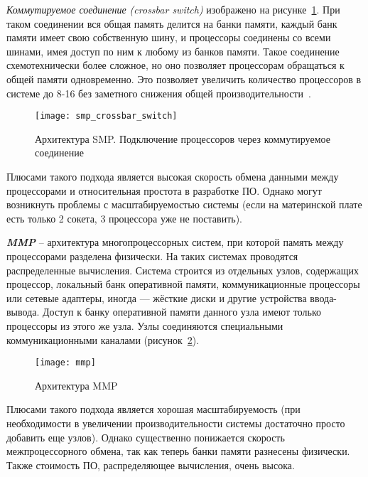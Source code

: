 \textit{Коммутируемое соединение (crossbar switch)} изображено на рисунке~\ref{SMPCrossbarSwitch:image}. При таком соединении вся общая память делится на банки памяти, каждый банк памяти имеет свою собственную шину, и процессоры соединены со всеми шинами, имея доступ по ним к любому из банков памяти. Такое соединение схемотехнически более сложное, но оно позволяет процессорам обращаться к общей памяти одновременно. Это позволяет увеличить количество процессоров в системе до 8-16 без заметного снижения общей производительности~\cite{Ryazanova2018}.

\begin{figure}[H]
    \texttt{[image: smp\_crossbar\_switch]}
    \caption{Архитектура SMP. Подключение процессоров через коммутируемое соединение}
    \label{SMPCrossbarSwitch:image}
\end{figure}

Плюсами такого подхода является высокая скорость обмена данными между процессорами и относительная простота в разработке ПО. Однако могут возникнуть проблемы с масштабируемостью системы (если на материнской плате есть только 2 сокета, 3 процессора уже не поставить).

\textbf{\textit{MMP}} -- архитектура многопроцессорных систем, при которой память между процессорами разделена физически. На таких системах проводятся распределенные вычисления. Система строится из отдельных узлов, содержащих процессор, локальный банк оперативной памяти, коммуникационные процессоры или сетевые адаптеры, иногда — жёсткие диски и другие устройства ввода-вывода. Доступ к банку оперативной памяти данного узла имеют только процессоры из этого же узла. Узлы соединяются специальными коммуникационными каналами (рисунок~\ref{MMP:image}).

\begin{figure}[H]
    \texttt{[image: mmp]}
    \caption{Архитектура MMP}
    \label{MMP:image}
\end{figure}

Плюсами такого подхода является хорошая масштабируемость (при необходимости в увеличении производительности системы достаточно просто добавить еще узлов). Однако существенно понижается скорость межпроцессорного обмена, так как теперь банки памяти разнесены физически. Также стоимость ПО, распределяющее вычисления, очень высока.
